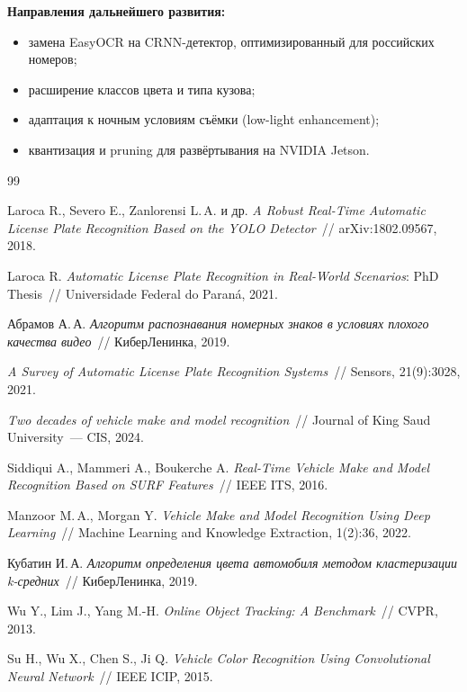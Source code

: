 \documentclass[14pt,a4paper]{report}
\numberwithin{equation}{chapter}
\numberwithin{figure}{chapter}
\numberwithin{table}{chapter}
\begin{document}
\textbf{Направления дальнейшего развития:}
\begin{itemize}[nosep]
  \item замена EasyOCR на CRNN-детектор, оптимизированный для российских номеров;
  \item расширение классов цвета и типа кузова;
  \item адаптация к ночным условиям съёмки (low-light enhancement);
  \item квантизация и pruning для развёртывания на NVIDIA Jetson.
\end{itemize}

\begin{thebibliography}{99}

Laroca R., Severo E., Zanlorensi L.\,A. и др.
\textit{A Robust Real-Time Automatic License Plate Recognition Based on the YOLO Detector}~//
arXiv:1802.09567, 2018.

Laroca R.
\textit{Automatic License Plate Recognition in Real-World Scenarios}: PhD Thesis~//
Universidade Federal do Paraná, 2021.

Абрамов А.\,А.
\textit{Алгоритм распознавания номерных знаков в условиях плохого качества видео}~//
КиберЛенинка, 2019.

\textit{A Survey of Automatic License Plate Recognition Systems}~//
Sensors, 21(9):3028, 2021.

\textit{Two decades of vehicle make and model recognition}~//
Journal of King Saud University~--- CIS, 2024.

Siddiqui A., Mammeri A., Boukerche A.
\textit{Real-Time Vehicle Make and Model Recognition Based on SURF Features}~//
IEEE ITS, 2016.

Manzoor M.\,A., Morgan Y.
\textit{Vehicle Make and Model Recognition Using Deep Learning}~//
Machine Learning and Knowledge Extraction, 1(2):36, 2022.

Кубатин И.\,А.
\textit{Алгоритм определения цвета автомобиля методом кластеризации k-средних}~//
КиберЛенинка, 2019.

Wu Y., Lim J., Yang M.-H.
\textit{Online Object Tracking: A Benchmark}~//
CVPR, 2013.

Su H., Wu X., Chen S., Ji Q.
\textit{Vehicle Color Recognition Using Convolutional Neural Network}~//
IEEE ICIP, 2015.

\end{thebibliography}
\end{document}
